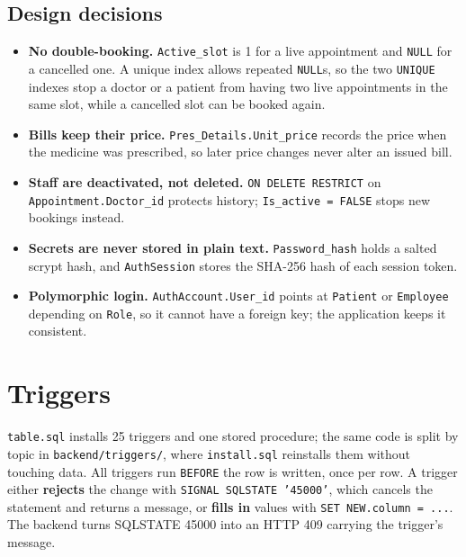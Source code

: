 \documentclass[11pt,a4paper]{article}
\newcommand{\code}[1]{\texttt{#1}}
\begin{document}
\subsection{Design decisions}

\begin{itemize}
  \item \textbf{No double-booking.} \code{Active\_slot} is 1 for a live appointment and \code{NULL} for a cancelled one. A unique index allows repeated \code{NULL}s, so the two \code{UNIQUE} indexes stop a doctor or a patient from having two live appointments in the same slot, while a cancelled slot can be booked again.
  \item \textbf{Bills keep their price.} \code{Pres\_Details.Unit\_price} records the price when the medicine was prescribed, so later price changes never alter an issued bill.
  \item \textbf{Staff are deactivated, not deleted.} \code{ON DELETE RESTRICT} on \code{Appointment.Doctor\_id} protects history; \code{Is\_active = FALSE} stops new bookings instead.
  \item \textbf{Secrets are never stored in plain text.} \code{Password\_hash} holds a salted scrypt hash, and \code{AuthSession} stores the SHA-256 hash of each session token.
  \item \textbf{Polymorphic login.} \code{AuthAccount.User\_id} points at \code{Patient} or \code{Employee} depending on \code{Role}, so it cannot have a foreign key; the application keeps it consistent.
\end{itemize}

\section{Triggers}

\code{table.sql} installs 25 triggers and one stored procedure; the same code is split by topic in \code{backend/triggers/}, where \code{install.sql} reinstalls them without touching data. All triggers run \code{BEFORE} the row is written, once per row. A trigger either \textbf{rejects} the change with \code{SIGNAL SQLSTATE '45000'}, which cancels the statement and returns a message, or \textbf{fills in} values with \code{SET NEW.column = ...}. The backend turns SQLSTATE 45000 into an HTTP 409 carrying the trigger's message.
\end{document}
